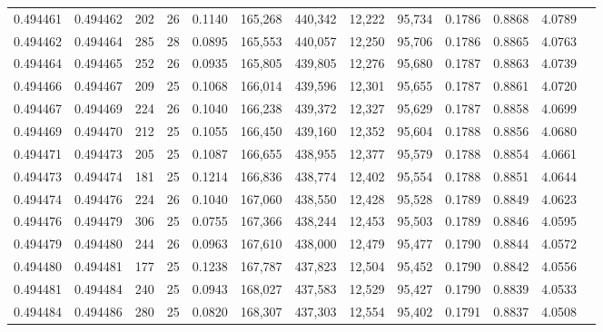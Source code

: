 \begin{tabular}{rrrrrrrrrrrrr}
0.494461 & 0.494462 & 202 &  26 &                                     0.1140 & 165,268 & 440,342 &  12,222 &  95,734 & 0.1786 & 0.8868 & 4.0789 \\
0.494462 & 0.494464 & 285 &  28 &                                     0.0895 & 165,553 & 440,057 &  12,250 &  95,706 & 0.1786 & 0.8865 & 4.0763 \\
0.494464 & 0.494465 & 252 &  26 &                                     0.0935 & 165,805 & 439,805 &  12,276 &  95,680 & 0.1787 & 0.8863 & 4.0739 \\
0.494466 & 0.494467 & 209 &  25 &                                     0.1068 & 166,014 & 439,596 &  12,301 &  95,655 & 0.1787 & 0.8861 & 4.0720 \\
0.494467 & 0.494469 & 224 &  26 &                                     0.1040 & 166,238 & 439,372 &  12,327 &  95,629 & 0.1787 & 0.8858 & 4.0699 \\
0.494469 & 0.494470 & 212 &  25 &                                     0.1055 & 166,450 & 439,160 &  12,352 &  95,604 & 0.1788 & 0.8856 & 4.0680 \\
0.494471 & 0.494473 & 205 &  25 &                                     0.1087 & 166,655 & 438,955 &  12,377 &  95,579 & 0.1788 & 0.8854 & 4.0661 \\
0.494473 & 0.494474 & 181 &  25 &                                     0.1214 & 166,836 & 438,774 &  12,402 &  95,554 & 0.1788 & 0.8851 & 4.0644 \\
0.494474 & 0.494476 & 224 &  26 &                                     0.1040 & 167,060 & 438,550 &  12,428 &  95,528 & 0.1789 & 0.8849 & 4.0623 \\
0.494476 & 0.494479 & 306 &  25 &                                     0.0755 & 167,366 & 438,244 &  12,453 &  95,503 & 0.1789 & 0.8846 & 4.0595 \\
0.494479 & 0.494480 & 244 &  26 &                                     0.0963 & 167,610 & 438,000 &  12,479 &  95,477 & 0.1790 & 0.8844 & 4.0572 \\
0.494480 & 0.494481 & 177 &  25 &                                     0.1238 & 167,787 & 437,823 &  12,504 &  95,452 & 0.1790 & 0.8842 & 4.0556 \\
0.494481 & 0.494484 & 240 &  25 &                                     0.0943 & 168,027 & 437,583 &  12,529 &  95,427 & 0.1790 & 0.8839 & 4.0533 \\
0.494484 & 0.494486 & 280 &  25 &                                     0.0820 & 168,307 & 437,303 &  12,554 &  95,402 & 0.1791 & 0.8837 & 4.0508 \\

\end{tabular}
